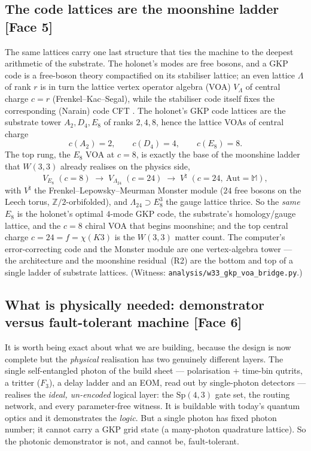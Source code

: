 \documentclass[11pt]{article}
\begin{document}
\subsection{The code lattices are the moonshine ladder \texorpdfstring{\normalfont\small[Face 5]}{[Face 5]}}

The same lattices carry one last structure that ties the machine to the deepest
arithmetic of the substrate. The holonet's modes are free bosons, and a GKP code
is a free-boson theory compactified on its stabiliser lattice; an even lattice
$\Lambda$ of rank $r$ is in turn the lattice vertex operator algebra (VOA)
$V_\Lambda$ of central charge $c=r$ (Frenkel--Kac--Segal), while the
stabiliser code itself fixes the corresponding (Narain) code
CFT \cite{flm,dymarsky-shapere}. The holonet's GKP code lattices are the
substrate tower $A_2,D_4,E_8$ of ranks $2,4,8$, hence the lattice VOAs of
central charge
\[
  c(A_2)=2,\qquad c(D_4)=4,\qquad c(E_8)=8 .
\]
The top rung, the $E_8$ VOA at $c=8$, is exactly the base of the moonshine ladder
that $W(3,3)$ already realises on the physics side,
\[
  V_{E_8}\;(c=8)\;\longrightarrow\;V_{\Lambda_{24}}\;(c=24)\;\longrightarrow\;
  V^{\natural}\;(c=24,\ \mathrm{Aut}=\mathbb M),
\]
with $V^{\natural}$ the Frenkel--Lepowsky--Meurman Monster module ($24$ free
bosons on the Leech torus, $\mathbb Z/2$-orbifolded), and $\Lambda_{24}\supset
E_8^{3}$ the gauge lattice thrice. So the \emph{same} $E_8$ is the holonet's
optimal $4$-mode GKP code, the substrate's homology/gauge lattice, and the $c=8$
chiral VOA that begins moonshine; and the top central charge $c=24=f=\chi(K3)$ is
the $W(3,3)$ matter count. The computer's error-correcting code and the Monster
module are one vertex-algebra tower --- the architecture and the moonshine
residual~(R2) are the bottom and top of a single ladder of substrate lattices.
(Witness: \texttt{analysis/w33\_gkp\_voa\_bridge.py}.)

\subsection{What is physically needed: demonstrator versus fault-tolerant machine \texorpdfstring{\normalfont\small[Face 6]}{[Face 6]}}

It is worth being exact about what we are building, because the design is now
complete but the \emph{physical} realisation has two genuinely different layers.
The single self-entangled photon of the build sheet --- polarisation $+$ time-bin
qutrits, a tritter ($F_3$), a delay ladder and an EOM, read out by
single-photon detectors --- realises the \emph{ideal, un-encoded} logical layer:
the $\mathrm{Sp}(4,3)$ gate set, the routing network, and every parameter-free
witness. It is buildable with today's quantum optics and it demonstrates the
\emph{logic}. But a single photon has fixed photon number; it cannot carry a GKP
grid state (a many-photon quadrature lattice). So the photonic demonstrator is
not, and cannot be, fault-tolerant.
\end{document}
